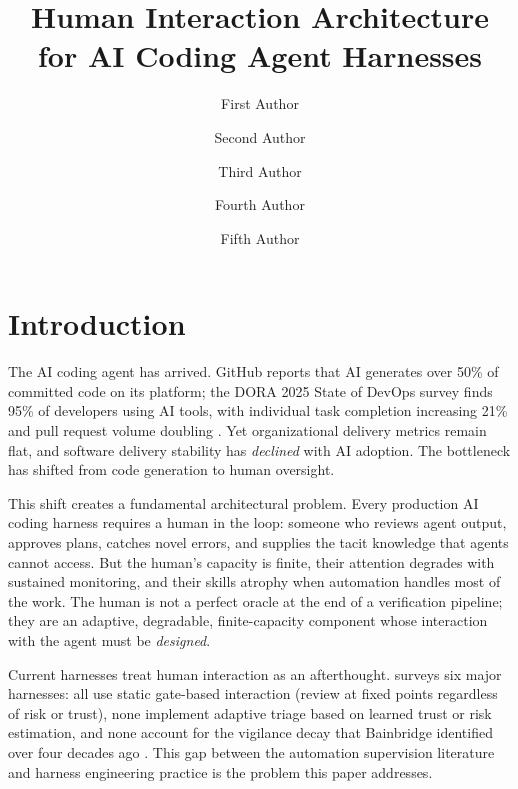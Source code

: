 \documentclass[11pt, a4paper, copyright]{googledeepmind}
\title{Human Interaction Architecture for AI Coding Agent Harnesses}
\author[1]{First Author}
\author[2]{Second Author}
\author[2]{Third Author}
\author[1]{Fourth Author}
\author[1]{Fifth Author}
\affil[*]{Equal Contribution}
\affil[1]{Affiliation 1}
\affil[2]{Affiliation 2}
\begin{document}
\maketitle

\section{Introduction}
\label{sec:intro}

The AI coding agent has arrived. GitHub reports that AI generates over 50\% of committed code on its platform; the DORA 2025 State of DevOps survey finds 95\% of developers using AI tools, with individual task completion increasing 21\% and pull request volume doubling \citep{dora2025}. Yet organizational delivery metrics remain flat, and software delivery stability has \emph{declined} with AI adoption. The bottleneck has shifted from code generation to human oversight.

This shift creates a fundamental architectural problem. Every production AI coding harness requires a human in the loop: someone who reviews agent output, approves plans, catches novel errors, and supplies the tacit knowledge that agents cannot access. But the human's capacity is finite, their attention degrades with sustained monitoring, and their skills atrophy when automation handles most of the work. The human is not a perfect oracle at the end of a verification pipeline; they are an adaptive, degradable, finite-capacity component whose interaction with the agent must be \emph{designed}.

Current harnesses treat human interaction as an afterthought.  surveys six major harnesses: all use static gate-based interaction (review at fixed points regardless of risk or trust), none implement adaptive triage based on learned trust or risk estimation, and none account for the vigilance decay that Bainbridge identified over four decades ago \citep{bainbridge1983ironies}. This gap between the automation supervision literature and harness engineering practice is the problem this paper addresses.
\end{document}
